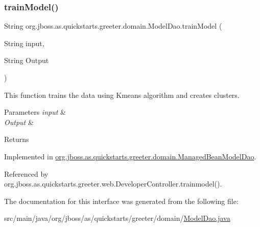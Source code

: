 \subsubsection{\texorpdfstring{train\+Model()}{trainModel()}}
{\footnotesize\ttfamily String org.\+jboss.\+as.\+quickstarts.\+greeter.\+domain.\+Model\+Dao.\+train\+Model (\begin{DoxyParamCaption}\item[{String}]{input,  }\item[{String}]{Output }\end{DoxyParamCaption})}



This function trains the data using Kmeans algorithm and creates clusters. 


\begin{DoxyParams}{Parameters}
{\em input} & \\
\hline
{\em Output} & \\
\hline
\end{DoxyParams}
\begin{DoxyReturn}{Returns}

\end{DoxyReturn}


Implemented in \hyperlink{classorg_1_1jboss_1_1as_1_1quickstarts_1_1greeter_1_1domain_1_1_managed_bean_model_dao_a3249ae7d8c010b92d8226cffbbe2de78}{org.\+jboss.\+as.\+quickstarts.\+greeter.\+domain.\+Managed\+Bean\+Model\+Dao}.



Referenced by org.\+jboss.\+as.\+quickstarts.\+greeter.\+web.\+Developer\+Controller.\+trainmodel().



The documentation for this interface was generated from the following file\+:\begin{DoxyCompactItemize}
\item 
src/main/java/org/jboss/as/quickstarts/greeter/domain/\hyperlink{_model_dao_8java}{Model\+Dao.\+java}\end{DoxyCompactItemize}
